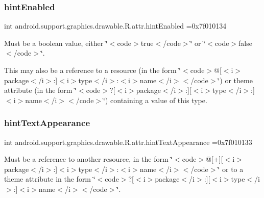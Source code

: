 \subsubsection{\texorpdfstring{hint\+Enabled}{hintEnabled}}
{\footnotesize\ttfamily int android.\+support.\+graphics.\+drawable.\+R.\+attr.\+hint\+Enabled =0x7f010134\hspace{0.3cm}{\ttfamily [static]}}

Must be a boolean value, either \char`\"{}$<$code$>$true$<$/code$>$\char`\"{} or \char`\"{}$<$code$>$false$<$/code$>$\char`\"{}. 

This may also be a reference to a resource (in the form \char`\"{}$<$code$>$@\mbox{[}$<$i$>$package$<$/i$>$\+:\mbox{]}$<$i$>$type$<$/i$>$\+:$<$i$>$name$<$/i$>$$<$/code$>$\char`\"{}) or theme attribute (in the form \char`\"{}$<$code$>$?\mbox{[}$<$i$>$package$<$/i$>$\+:\mbox{]}\mbox{[}$<$i$>$type$<$/i$>$\+:\mbox{]}$<$i$>$name$<$/i$>$$<$/code$>$\char`\"{}) containing a value of this type. \mbox{\label{classandroid_1_1support_1_1graphics_1_1drawable_1_1R_1_1attr_acbae1188d572cb757a30ffe2b5fbbee2}} 
\subsubsection{\texorpdfstring{hint\+Text\+Appearance}{hintTextAppearance}}
{\footnotesize\ttfamily int android.\+support.\+graphics.\+drawable.\+R.\+attr.\+hint\+Text\+Appearance =0x7f010133\hspace{0.3cm}{\ttfamily [static]}}

Must be a reference to another resource, in the form \char`\"{}$<$code$>$@\mbox{[}+\mbox{]}\mbox{[}$<$i$>$package$<$/i$>$\+:\mbox{]}$<$i$>$type$<$/i$>$\+:$<$i$>$name$<$/i$>$$<$/code$>$\char`\"{} or to a theme attribute in the form \char`\"{}$<$code$>$?\mbox{[}$<$i$>$package$<$/i$>$\+:\mbox{]}\mbox{[}$<$i$>$type$<$/i$>$\+:\mbox{]}$<$i$>$name$<$/i$>$$<$/code$>$\char`\"{}. \mbox{\label{classandroid_1_1support_1_1graphics_1_1drawable_1_1R_1_1attr_acd2ae5212bb78456235e3ccfd0c730a0}} 
